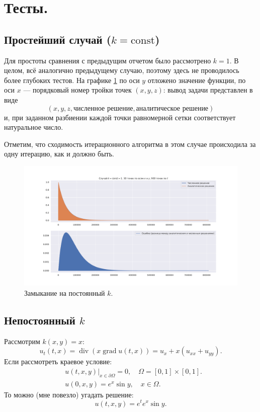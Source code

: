 \documentclass[14pt,a4paper]{extarticle}
\newcommand{\1}{\mathbbm{1}}
\begin{document}
\section{Тесты.}
\subsection{Простейший случай ($k = \text{const}$)}
Для простоты сравнения с предыдущим отчетом было рассмотрено $k=1$. В целом, всё аналогично 
предыдущему случаю, поэтому здесь не проводилось более глубоких тестов. На графике \ref{constk} по оси $y$ отложено значение функции, 
по оси $x$ --- порядковый номер тройки точек $(x, y, z)$: вывод задачи представлен в виде 
$$
(x,y,z,\text{численное решение}, \text{аналитическое решение})
$$ 
и, при 
заданном разбиении каждой точки равномерной сетки соответствует натуральное число.  

Отметим, что сходимость итерационного алгоритма в этом случае происходила за одну итерацию, как и должно быть.

\begin{figure}
    \centering
    \includegraphics[scale=0.44]{figs/constantksol.pdf}
    \caption{Замыкание на постоянный $k$.}
    \label{constk}
\end{figure}

\subsection{Непостоянный $k$}
Рассмотрим $k(x,y) = x$:
\begin{equation*} 
    u_t(t, x) = \operatorname{div} (x \operatorname{grad} u(t, x)) = u_x + x(u_{xx}+u_{yy}).
\end{equation*}
Если рассмотреть краевое условие:
\begin{align*} 
    &u(t, x, y) \big| _{x \in \partial \Omega} = 0, \quad \Omega = [0,1]\times [0,1]. \\
    &u(0, x, y) = e^x \sin y, \quad x \in \Omega. 
\end{align*}
То можно (мне повезло) угадать решение:
$$
u(t, x, y) = e^t e^x \sin y.
$$
 
\end{document}
